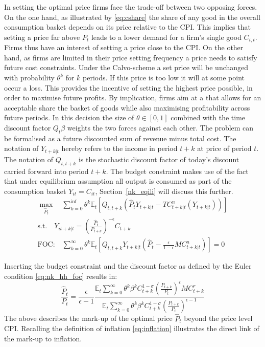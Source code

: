 \documentclass[12pt,a4paper,english]{article} %
\newcommand{\E}{\mathbb{E}} %
\begin{document}
	In setting the optimal price firms face the trade-off between two opposing forces. On the one hand, as illustrated by \eqref{eq:cshare} the share of any good in the overall consumption basket depends on its price relative to the CPI. This implies that setting a price far above $P_t$ leads to a lower demand for a firm's single good $C_{i,t}$. Firms thus have an interest of setting a price close to the CPI.
	On the other hand, as firms are limited in their price setting frequency a price needs to satisfy future cost constraints. Under the Calvo-scheme a set price will be unchanged with probability $\theta^k$ for $k$ periods. If this price is too low it will at some point occur a loss. This provides the incentive of setting the highest price possible, in order to maximise future profits.
	By implication, firms aim at a that allows for an acceptable share the basket of goods while also maximising profitability across future periods. In this decision the size of $\theta \in [0,1]$ combined with the time discount factor $Q_t \beta$ weights the two forces against each other. 
	The problem can be formalised as a future discounted sum of revenue minus total cost. The notation of $Y_{t+k|t}$ hereby refers to the income in period $t+k$ at price of period $t$. The notation of $Q_{t,t+k}$ is the stochastic discount factor of today's discount carried forward into period $t+k$. The budget constraint makes use of the fact that under equilibrium assumption all output is consumed as part of the consumption basket $Y_{it} = C_{it}$, Section~\ref{nk_eqili} will discuss this further.	
	\begin{equation}
		\begin{aligned}
			\max_{\hat{P}_t}
			\quad
			\sum_{k=0}^{\inf} \theta^k \E_t 
			\left[
			Q_{t, t+k} 
			\left(
			\hat{P}_t Y_{t+k|t} - TC_{t+k|t}^n(Y_{t+k|t})
			\right)
			\right] \\
			\textrm{s.t.}
			\quad
			Y_{it+k|t} = \left(\frac{\hat{P}_t}{P_{t+k}} \right)^{-\epsilon} C_{t+k} \\
			\textrm{FOC:} \quad
			\sum_{k=0}^{\infty} \theta^k \E_t 
			\left[
			Q_{t,t+k} Y_{t+k|t} 
			\left(
			\hat{P}_t - \frac{\epsilon}{1 - \epsilon} MC_{t+k|t}^n
			\right)
			\right]
			= 0
		\end{aligned}
	\end{equation}
	
	Inserting the budget constraint and the discount factor as defined by the Euler condition \eqref{eq:nk_hh_foc} results in:
	\begin{equation}
		\frac{\hat{P}_t}{P_t} = \frac{\epsilon}{\epsilon-1} 
		\frac{
		\E_t \sum_{k=0}^{\infty} \theta^k \beta^k C_{t+k}^{1-\sigma} (\frac{P_{t+k}}{P_t})^\epsilon MC_{t+k}^r
		}{
		\E_t \sum_{k=0}^{\infty} \theta^k \beta^k C_{t+k}^{1-\sigma} (\frac{P_{t+k}}{P_t})^{\epsilon-1}
		}
	\end{equation}
	The above describes the mark-up of the optimal price $\hat{P}_t$ beyond the price level CPI. Recalling the definition of inflation \eqref{eq:inflation} illustrates the direct link of the mark-up to inflation. 
	
\end{document}
